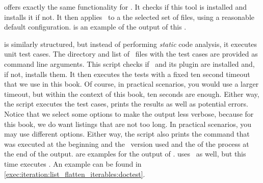  offers exactly the same functionality for \pylint.
It checks if this tool is installed and installs it if not.
It then applies \pylint\ to a the selected set of files, using a reasonable default configuration.
 is an example of the output of this .

 is similarly structured, but instead of performing \emph{static} code analysis, it executes unit test cases.
The directory and list of \python\ files with the test cases are provided as command line arguments.
This script checks if \pytest\ and its plugin  are installed and, if not, installs them.
It then executes the tests with a fixed ten second timeout that we use in this book.
Of course, in practical scenarios, you would use a larger timeout, but within the context of this book, ten seconds are enough.
Either way, the script executes the test cases, prints the results as well as potential errors.
Notice that we select some options to make the output less verbose, because for this book, we do want listings that are not too long.
In practical scenarios, you may use different options.
Either way, the script also prints the command that was executed at the beginning and the \pytest\ version used and the  of the process at the end of the output.
 are examples for the output of \pytest.
 uses \pytest\ as well, but this time executes .
An example can be found in \cref{exec:iteration:list_flatten_iterables:doctest}.%
%
\endhsection%
%

